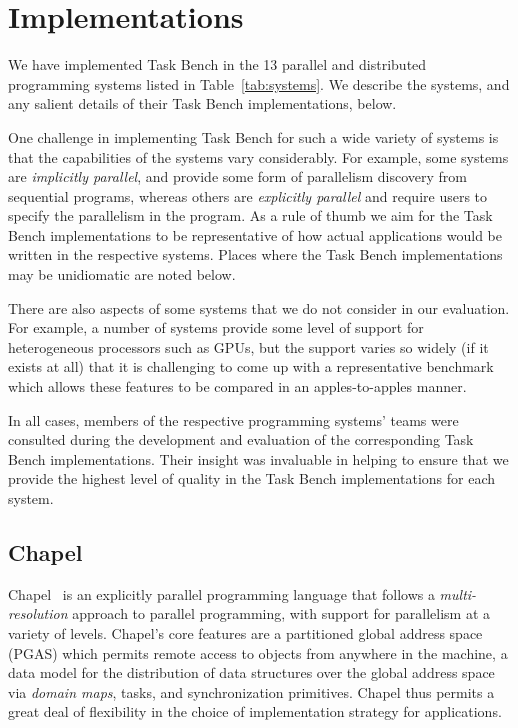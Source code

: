 \section{Implementations}
\label{sec:implementation}



We have implemented Task Bench in the 13 parallel and distributed
programming systems listed in Table~\ref{tab:systems}. We describe the
systems, and any salient details of their Task Bench implementations,
below.

One challenge in implementing Task Bench for such a wide variety of
systems is that the capabilities of the systems vary considerably. For
example, some systems are \emph{implicitly parallel}, and provide some
form of parallelism discovery from sequential programs, whereas others
are \emph{explicitly parallel} and require users to specify the
parallelism in the program. As a rule of thumb we aim for the Task
Bench implementations to be representative of how actual applications
would be written in the respective systems. Places where the Task
Bench implementations may be unidiomatic are noted below.

There are also aspects of some systems that we do not consider in our
evaluation. For example, a number of systems provide some level of
support for heterogeneous processors such as GPUs, but the support
varies so widely (if it exists at all) that it is challenging to come
up with a representative benchmark which allows these features to be
compared in an apples-to-apples manner.

In all cases, members of the respective programming systems' teams
were consulted during the development and evaluation of the
corresponding Task Bench implementations. Their insight was invaluable
in helping to ensure that we provide the highest level of quality in the Task
Bench implementations for each system.

\subsection{Chapel}

Chapel~\cite{Chapel07} is an explicitly parallel programming language
that follows a \emph{multi-resolution} approach to parallel
programming, with support for parallelism at a variety of
levels. Chapel's core features are a partitioned global address space
(PGAS) which permits remote access to objects from anywhere in the
machine, a data model for the distribution of data structures over the
global address space via \emph{domain maps}, tasks, and
synchronization primitives. Chapel thus permits a great deal of
flexibility in the choice of implementation strategy for applications.

